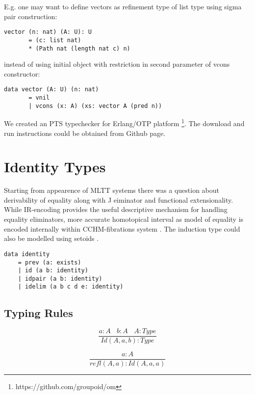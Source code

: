 \documentclass{aip-cp}
\begin{document}
E.g. one may want to define vectors as refinement type of list type using sigma pair construction:

\begin{lstlisting}[mathescape=true]
    vector (n: nat) (A: U): U
       = (c: list nat)
       * (Path nat (length nat c) n)
\end{lstlisting}

instead of using initial object with restriction in second parameter of vcons constructor:

\begin{lstlisting}[mathescape=true]
    data vector (A: U) (n: nat)
       = vnil
       | vcons (x: A) (xs: vector A (pred n))
\end{lstlisting}

We created an PTS typechecker for Erlang/OTP platform \footnote{https://github.com/groupoid/om}.
The download and run instructions could be obtained from Github page.

\section{Identity Types}

Starting from appearence of MLTT systems there was a question about derivability of equality
along with J eiminator and functional extensionality. While IR-encoding \cite{Dagand13} provides the
useful descriptive mechanism for handling equality eliminators, more accurate homotopical
interval as model of equality is encoded internally within CCHM-fibrations system \cite{Orton17}.
The induction type could also be modelled using setoids \cite{Bishop67}.

\begin{lstlisting}[mathescape=true]
data identity
    = prev (a: exists)
    | id (a b: identity)
    | idpair (a b: identity)
    | idelim (a b c d e: identity)
\end{lstlisting}

\newpage
\subsection{Typing Rules}

\begin{equation}
\tag{$Id$-formation}
\dfrac
  {a:A\ \ \ \ b:A\ \ \ \ A:Type}
  {Id(A,a,b) : Type}
\end{equation}

\begin{equation}
\tag{$Id$-intro}
\dfrac
  {a:A}
  {refl(A,a) : Id(A,a,a) }
\end{equation}
\end{document}
